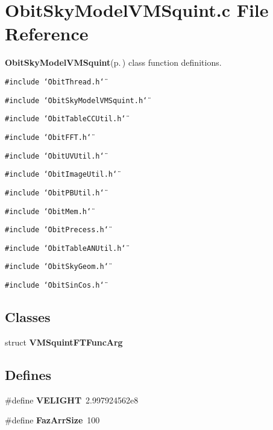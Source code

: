 \section{Obit\-Sky\-Model\-VMSquint.c File Reference}
\label{ObitSkyModelVMSquint_8c}
{\bf Obit\-Sky\-Model\-VMSquint}{\rm (p.\,\pageref{structObitSkyModelVMSquint})} class function definitions. 

{\tt \#include \char`\"{}Obit\-Thread.h\char`\"{}}\par
{\tt \#include \char`\"{}Obit\-Sky\-Model\-VMSquint.h\char`\"{}}\par
{\tt \#include \char`\"{}Obit\-Table\-CCUtil.h\char`\"{}}\par
{\tt \#include \char`\"{}Obit\-FFT.h\char`\"{}}\par
{\tt \#include \char`\"{}Obit\-UVUtil.h\char`\"{}}\par
{\tt \#include \char`\"{}Obit\-Image\-Util.h\char`\"{}}\par
{\tt \#include \char`\"{}Obit\-PBUtil.h\char`\"{}}\par
{\tt \#include \char`\"{}Obit\-Mem.h\char`\"{}}\par
{\tt \#include \char`\"{}Obit\-Precess.h\char`\"{}}\par
{\tt \#include \char`\"{}Obit\-Table\-ANUtil.h\char`\"{}}\par
{\tt \#include \char`\"{}Obit\-Sky\-Geom.h\char`\"{}}\par
{\tt \#include \char`\"{}Obit\-Sin\-Cos.h\char`\"{}}\par
\subsection*{Classes}
\begin{CompactItemize}
\item 
struct {\bf VMSquint\-FTFunc\-Arg}
\end{CompactItemize}
\subsection*{Defines}
\begin{CompactItemize}
\item 
\#define {\bf VELIGHT}\ 2.997924562e8
\item 
\#define {\bf Faz\-Arr\-Size}\ 100
\end{CompactItemize}

